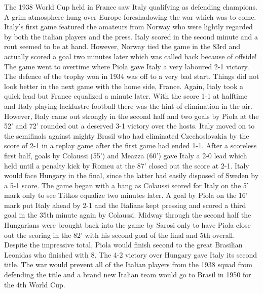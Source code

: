 The 1938 World Cup held in France saw Italy qualifying as defending champions.
A grim atmosphere hung over Europe foreshadowing the war which was to come.
Italy's first game featured the amateurs from Norway who were lightly
regarded by both the italian players and the press. Italy scored in the second 
minute and a rout seemed to be at hand. However, Norway tied the game in the 
83rd and actually scored a goal two minutes later which was called back because
of offside! The game went to overtime where Piola gave Italy a very laboured 
2-1 victory. The defence of the trophy won in 1934 was off to a very bad start.
Things did not look better in the next game with the home side, France. Again, 
Italy took a quick lead but France equalized a minute later. With the score 1-1
at halftime and Italy playing lacklustre football there was the hint of 
elimination in the air. However, Italy came out strongly in the second half and
two goals by Piola at the 52' and 72' rounded out a deserved 3-1 victory over 
the hosts. Italy moved on to the semifinals against mighty Brasil who had 
eliminated Czechoslovakia by the score of 2-1 in a replay game after the first
game had ended 1-1. After a scoreless first half, goals by Colaussi (55') and 
Meazza (60') gave Italy a 2-0 lead which held until a penalty kick by Romeu at 
the 87' closed out the score at 2-1.  Italy would face Hungary in the final,
since the latter had easily disposed of Sweden by a 5-1 score. The game began 
with a bang as Colaussi scored for Italy on the 5' mark only to see Titkos 
equalize two minutes later. A goal by Piola on the 16' mark put Italy ahead by 
2-1 and the Italians kept pressing and scored a third goal in the 35th minute 
again by Colaussi. Midway through the second half the Hungarians were brought 
back into the game by Sarosi only to have Piola close out the scoring in the 
82' with his second goal of the final and 5th overall. Despite the impressive 
total, Piola would finish second to the great Brasilian Leonidas who finished 
with 8. The 4-2 victory over Hungary gave Italy its second title. The war would
prevent all of the Italian players from the 1938 squad from defending the title
and a brand new Italian team would go to Brasil in 1950 for the 4th World Cup.


